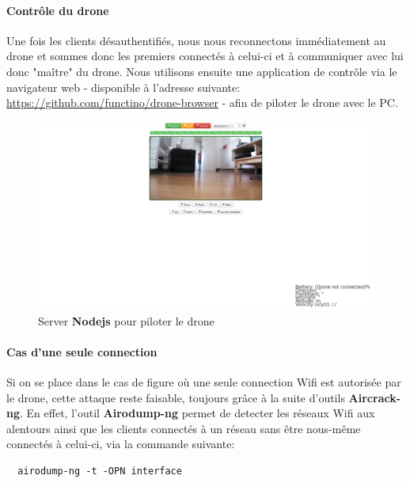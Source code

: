 \paragraph{Contrôle du drone}
Une fois les clients désauthentifiés, nous nous reconnectons immédiatement au drone et sommes donc les premiers connectés à celui-ci et à communiquer avec lui donc "maître" du drone. Nous utilisons ensuite une application de contrôle via le navigateur web - disponible à l'adresse suivante: \url{https://github.com/functino/drone-browser} - afin de piloter le drone avec le PC.

\begin{figure}[H]
  \centering
  \includegraphics[scale=0.3]{images/drone_browser}
  \caption{Server \textbf{Nodejs} pour piloter le drone}
\end{figure}

\paragraph{Cas d'une seule connection}
Si on se place dans le cas de figure où une seule connection Wifi est autorisée par le drone, cette attaque reste faisable, toujours grâce à la suite d'outils \textbf{Aircrack-ng}. En effet, l'outil \textbf{Airodump-ng} permet de detecter les réseaux Wifi aux alentours ainsi que les clients connectés à un réseau sans être nous-même connectés à celui-ci, via la commande suivante:
\begin{verbatim}
  airodump-ng -t -OPN interface
\end{verbatim}

